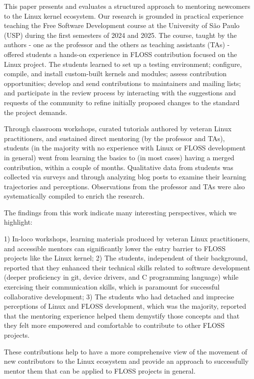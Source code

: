 This paper presents and evaluates a structured approach to mentoring newcomers to the Linux kernel ecosystem. Our research is grounded in practical experience teaching the Free Software Development course at the University of São Paulo (USP) during the first semesters of 2024 and 2025. The course, taught by the authors - one as the professor and the others as teaching assistants (TAs) - offered students a hands-on experience in FLOSS contribution focused on the Linux project. The students learned to set up a testing environment; configure, compile, and install custom-built kernels and modules; assess contribution opportunities; develop and send contributions to maintainers and mailing lists; and participate in the review process by interacting with the suggestions and requests of the community to refine initially proposed changes to the standard the project demands.

Through classroom workshops, curated tutorials authored by veteran Linux practitioners, and sustained direct mentoring (by the professor and TAs), students (in the majority with no experience with Linux or FLOSS development in general) went from learning the basics to (in most cases) having a merged contribution, within a couple of months. Qualitative data from students was collected via surveys and through analyzing blog posts to examine their learning trajectories and perceptions. Observations from the professor and TAs were also systematically compiled to enrich the research.

The findings from this work indicate many interesting perspectives, which we highlight:

1) In-loco workshops, learning materials produced by veteran Linux practitioners, and accessible mentors can significantly lower the entry barrier to FLOSS projects like the Linux kernel;
2) The students, independent of their background, reported that they enhanced their technical skills related to software development (deeper proficiency in git, device drivers, and C programming language) while exercising their communication skills, which is paramount for successful collaborative development;
3) The students who had detached and imprecise perceptions of Linux and FLOSS development, which was the majority, reported that the mentoring experience helped them demystify those concepts and that they felt more empowered and comfortable to contribute to other FLOSS projects.  

These contributions help to have a more comprehensive view of the movement of new contributors to the Linux ecosystem and provide an approach to successfully mentor them that can be applied to FLOSS projects in general.